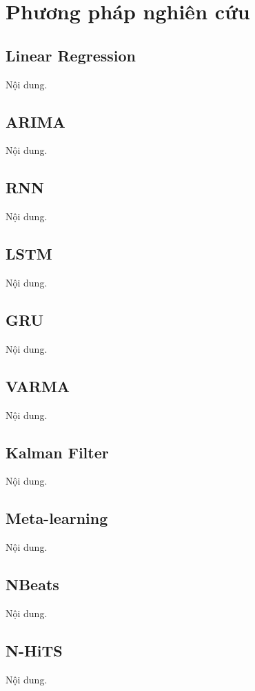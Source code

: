 \section{Phương pháp nghiên cứu}
\subsection{Linear Regression}
Nội dung.

\subsection{ARIMA}
Nội dung.

\subsection{RNN}
Nội dung. 

\subsection{LSTM}
Nội dung.

\subsection{GRU}
Nội dung.

\subsection{VARMA}
Nội dung. 

\subsection{Kalman Filter}
Nội dung.

\subsection{Meta-learning}
Nội dung.


\subsection{NBeats}
Nội dung.

\subsection{N-HiTS}
Nội dung.